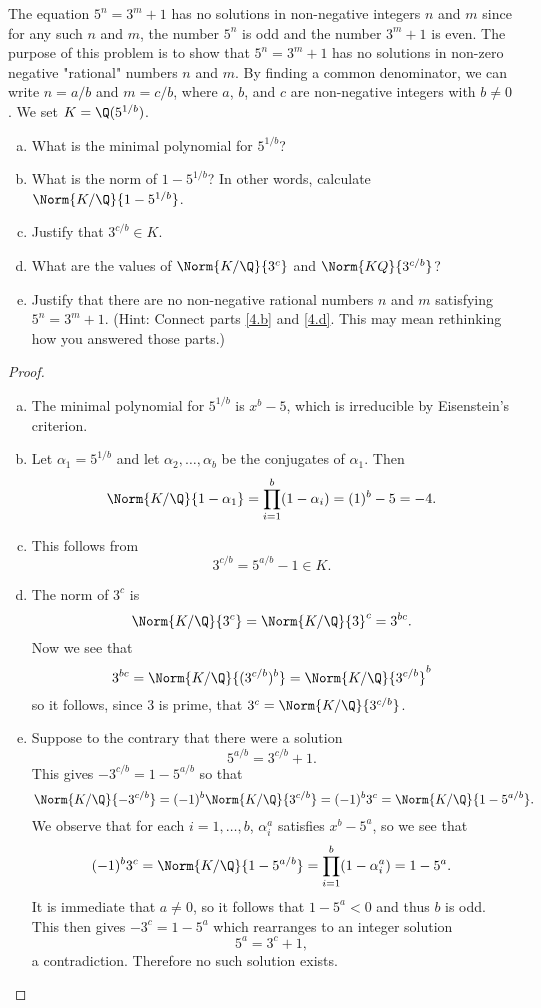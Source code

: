 \documentclass[10pt]{amsart}
\begin{document}
\begin{thm}\label{Ex4}
	The equation $5^n = 3^m + 1$ has no solutions in non-negative integers $n$ and $m$ since for any such $n$ and $m$, the number $5^n$ is odd and the number $3^m + 1$ is even.
	The purpose of this problem is to show that $5^n = 3^m + 1$ has no solutions in non-zero negative "rational" numbers $n$ and $m$.
	By finding a common denominator, we can write $n = a/b$ and $m = c/b$, where $a$, $b$, and $c$ are non-negative integers with $b \neq 0$.
	We set $K = \Q(5^{1/b})$.
	\begin{enumerate}[(a)]
		\item\label{4.a}
		What is the minimal polynomial for $5^{1/b}$?
		\item\label{4.b}
		What is the norm of $1 - 5^{1/b}$?
		In other words, calculate $\Norm{K/\Q}{1 - 5^{1/b}}$.
		\item\label{4.c}
		Justify that $3^{c/b} \in K$.
		\item\label{4.d}
		What are the values of $\Norm{K/\Q}{3^c}$ and $\Norm{K\/Q}{3^{c/b}}$?
		\item\label{4.e}
		Justify that there are no non-negative rational numbers $n$ and $m$ satisfying $5^n = 3^m + 1$.
		(Hint: Connect parts \eqref{4.b} and \eqref{4.d}.
		This may mean rethinking how you answered those parts.)
	\end{enumerate}

	\begin{proof}
		\begin{enumerate}[(a)]
			\item
			The minimal polynomial for $5^{1/b}$ is $x^b - 5$, which is irreducible by Eisenstein's criterion.
			\item
			Let $\alpha_1 = 5^{1/b}$ and let $\alpha_2, \ldots, \alpha_b$ be the conjugates of $\alpha_1$.
			Then
			$$\Norm{K/\Q}{1 - \alpha_1} = \prod_{i=1}^b (1 - \alpha_i) = (1)^b - 5 = -4.$$
			\item
			This follows from
			$$3^{c/b} = 5^{a/b} - 1 \in K.$$
			\item
			The norm of $3^c$ is
			$$\Norm{K/\Q}{3^c} = \Norm{K/\Q}{3}^c = 3^{bc}.$$
			Now we see that 
			$$3^{bc} = \Norm{K/\Q}{(3^{c/b})^b} = \Norm{K/\Q}{3^{c/b}}^b$$
			so it follows, since $3$ is prime, that $3^c = \Norm{K/\Q}{3^{c/b}}$.
			\item
			Suppose to the contrary that there were a solution
			$$5^{a/b} = 3^{c/b} + 1.$$
			This gives $-3^{c/b} = 1 - 5^{a/b}$ so that
			$$\Norm{K/\Q}{-3^{c/b}} = (-1)^b\Norm{K/\Q}{3^{c/b}} = (-1)^b3^c = \Norm{K/\Q}{1 - 5^{a/b}}.$$
			We observe that for each $i = 1, \ldots, b$, $\alpha_i^a$ satisfies $x^b - 5^a$, so we see that
			$$(-1)^b3^c = \Norm{K/\Q}{1 - 5^{a/b}} = \prod_{i=1}^b (1 - \alpha_i^a) = 1 - 5^a.$$
			It is immediate that $a \neq 0$, so it follows that $1 - 5^a < 0$ and thus $b$ is odd.
			This then gives $-3^c = 1 - 5^a$ which rearranges to an integer solution
			$$5^a = 3^c + 1,$$
			a contradiction.
			Therefore no such solution exists.
			
		\end{enumerate}
	\end{proof}
\end{thm}
\end{document}
